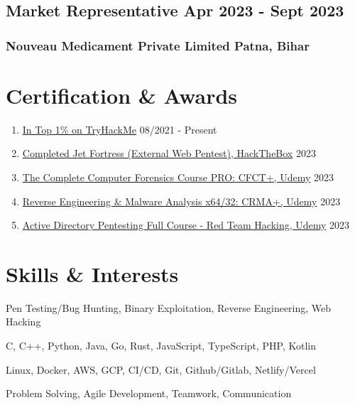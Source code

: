\documentclass[11pt]{article} %
\begin{document}
\subsection{Market Representative \hfill Apr 2023 - Sept 2023}
\subsubsection{Nouveau Medicament Private Limited \hfill Patna, Bihar}

\vspace{18pt}

\section{Certification \& Awards}
\begin{enumerate}[label=\null, left=0pt..0pt, itemsep=0pt]
	\item \href{https://tryhackme.com/p/hackersbrain}{In Top 1\% on TryHackMe} \hfill 08/2021 - Present
  \item \href{https://www.instagram.com/p/CpqIzPHPiM5/}{Completed Jet Fortress (External Web Pentest), HackTheBox} \hfill 2023
	\item \href{https://www.udemy.com/certificate/UC-11c0ac06-52c6-4b05-b48a-a91552b8eeed/}{The Complete Computer Forensics Course PRO: CFCT+, Udemy} \hfill 2023
	\item \href{https://www.udemy.com/certificate/UC-2d40b62d-ed80-4b82-9922-896ee12cb989/}{Reverse Engineering \& Malware Analysis x64/32: CRMA+, Udemy} \hfill 2023
	\item \href{https://www.udemy.com/certificate/UC-4ae950ef-117a-4a64-b845-c545d7714d77/}{Active Directory Pentesting Full Course - Red Team Hacking, Udemy} \hfill 2023
\end{enumerate}

\section{Skills \& Interests}
\begin{description}[itemsep=0pt]
  \item[Hacking] Pen Testing/Bug Hunting, Binary Exploitation, Reverse Engineering, Web Hacking
	\item[Programming] C, C++, Python, Java, Go, Rust, JavaScript, TypeScript, PHP, Kotlin
	\item[DevOps] Linux, Docker, AWS, GCP, CI/CD, Git, Github/Gitlab, Netlify/Vercel
	\item[Soft Skills] Problem Solving, Agile Development, Teamwork, Communication
\end{description}
\end{document}
